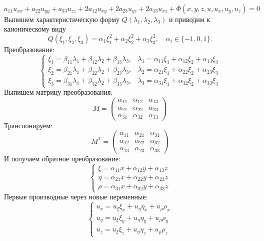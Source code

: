 \documentclass[9pt]{article}
\begin{document}
\ 
\begin{equation}
a_{11}u_{xx}+a_{22}u_{yy}+a_{33}u_{zz}+2a_{12}u_{xy}+2a_{23}u_{yz}+2a_{13}u_{xz}+\Phi(x,y,z,u,u_x,u_y,u_z)=0
\end{equation}
Выпишем характеристическую форму \(Q(\lambda_1,\lambda_2,\lambda_3)\) и приводим к каноническому виду
\[Q(\xi_1,\xi_2,\xi_3)=\alpha_1\xi_1^2+\alpha_2\xi_2^2+\alpha_3\xi_3^2,\quad\alpha_i\in\{-1,0,1\}.\]
Преобразование:
\[\left\{\begin{array}{ll}
    \xi_1=\beta_{11}\lambda_1+\beta_{12}\lambda_2+\beta_{13}\lambda_3, & 
    \lambda_1=\alpha_{11}\xi_1+\alpha_{12}\xi_2+\alpha_{13}\xi_3\\
    \xi_2=\beta_{21}\lambda_1+\beta_{22}\lambda_2+\beta_{23}\lambda_3, &
    \lambda_2=\alpha_{21}\xi_1+\alpha_{22}\xi_2+\alpha_{23}\xi_3\\
    \xi_3=\beta_{31}\lambda_1+\beta_{32}\lambda_2+\beta_{33}\lambda_3, &
    \lambda_3=\alpha_{31}\xi_1+\alpha_{32}\xi_2+\alpha_{33}\xi_3
\end{array}\right.\]
Выпишем матрицу преобразования:
\[M=\left(
\begin{array}{ccc}
    \alpha_{11} & \alpha_{12} & \alpha_{13} \\
    \alpha_{21} & \alpha_{22} & \alpha_{23} \\
    \alpha_{31} & \alpha_{32} & \alpha_{33}
\end{array}
\right)\]
Транспонируем:
\[M^T=\left(
\begin{array}{ccc}
    \alpha_{11} & \alpha_{21} & \alpha_{31} \\
    \alpha_{12} & \alpha_{22} & \alpha_{32} \\
    \alpha_{13} & \alpha_{23} & \alpha_{33}
\end{array}
\right)\]
И получаем обратное преобразование:
\[\left\{\begin{array}{l}
    \xi=\alpha_{11}x+\alpha_{12}y+\alpha_{13}z \\
    \eta=\alpha_{21}x+\alpha_{22}y+\alpha_{23}z \\
    \rho=\alpha_{31}x+\alpha_{32}y+\alpha_{33}z
\end{array}\right.\]
Первые производные через новые переменные:
\[\left\{\begin{array}{l}
    u_x=u_\xi\xi_x+u_\eta\eta_x+u_\rho\rho_x \\
    u_y=u_\xi\xi_y+u_\eta\eta_y+u_\rho\rho_y \\
    u_z=u_\xi\xi_z+u_\eta\eta_z+u_\rho\rho_z
\end{array}\right.\]
\end{document}
